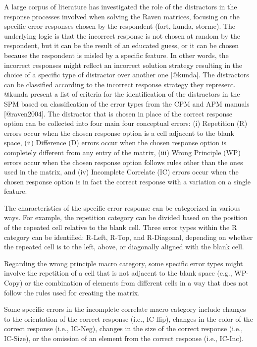 A large corpus of literature has investigated the role of the distractors in the response processes involved when solving the Raven matrices, focusing on the specific error responses chosen by the respondent (fort, kunda, storme).
The underlying logic is that the incorrect response is not chosen at random by the respondent, but it can be the result of an educated guess, or it can be chosen because the respondent is misled by a specific feature.
In other words, the incorrect responses might reflect an incorrect solution strategy resulting in the choice of a specific type of distractor over another one {[}@kunda{]}.
The distractors can be classified according to the incorrect response strategy they represent.
@kunda present a list of criteria for the identification of the distractors in the SPM based on classification of the error types from the CPM and APM manuals {[}@raven2004{]}.
The distractor that is chosen in place of the correct response option can be collected into four main four conceptual errors: (i) Repetition (R) errors occur when the chosen response option is a cell adjacent to the blank space, (ii) Difference (D) errors occur when the chosen response option is completely different from any entry of the matrix, (iii) Wrong Principle (WP) errors occur when the chosen response option follows rules other than the ones used in the matrix, and (iv) Incomplete Correlate (IC) errors occur when the chosen response option is in fact the correct response with a variation on a single feature.

The characteristics of the specific error response can be categorized in various ways. For example, the repetition category can be divided based on the position of the repeated cell relative to the blank cell. Three error types within the R category can be identified: R-Left, R-Top, and R-Diagonal, depending on whether the repeated cell is to the left, above, or diagonally aligned with the blank cell.

Regarding the wrong principle macro category, some specific error types might involve the repetition of a cell that is not adjacent to the blank space (e.g., WP-Copy) or the combination of elements from different cells in a way that does not follow the rules used for creating the matrix.

Some specific errors in the incomplete correlate macro category include changes to the orientation of the correct response (i.e., IC-flip), changes in the color of the correct response (i.e., IC-Neg), changes in the size of the correct response (i.e., IC-Size), or the omission of an element from the correct response (i.e., IC-Inc).

